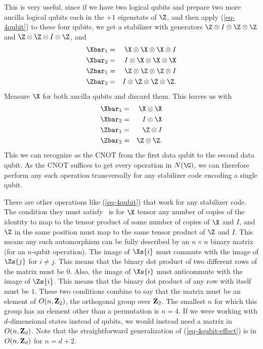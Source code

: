This is very useful, since if we have two logical qubits and prepare two more
ancilla logical qubits each in the $+1$ eigenstate of $\Z$, and then apply
(\ref{eq-4qubit}) to these four qubits, we get a stabilizer with generators
$\Z \otimes I \otimes \Z \otimes \Z$ and $\Z \otimes \Z \otimes I \otimes
\Z$, and
\begin{eqnarray}
	\Xbar_1 & = & \X \otimes \X \otimes \X \otimes I \nonumber \\
	\Xbar_2 & = & I \otimes \X \otimes \X \otimes \X \\
	\Zbar_1 & = & \Z \otimes \Z \otimes \Z \otimes I \nonumber \\
	\Zbar_2 & = & I \otimes \Z \otimes \Z \otimes \Z. \nonumber
\end{eqnarray}
Measure $\X$ for both ancilla qubits and discard them.  This leaves us
with
\begin{eqnarray}
	\Xbar_1 & = & \X \otimes \X \nonumber \\
	\Xbar_2 & = & I \otimes \X \\
	\Zbar_1 & = & \Z \otimes I \nonumber \\
	\Zbar_2 & = & \Z \otimes \Z. \nonumber
\end{eqnarray}
This we can recognize as the CNOT from the first data qubit to the second
data qubit.  As the CNOT suffices to get every operation in $N(\G)$, we can
therefore perform any such operation transversally for any stabilizer code
encoding a single qubit.

There are other operations like (\ref{eq-4qubit}) that work for any
stabilizer code.  The condition they must satisfy~\cite{rains-orthogonal} is
for $\X$ tensor any number of copies of the identity to map to the tensor
product of some number of copies of $\X$ and $I$, and $\Z$ in the same
position must map to the same tensor product of $\Z$ and $I$.  This means
any such automorphism can be fully described by an $n \times n$ binary
matrix (for an $n$-qubit operation).  The image of $\Xs{i}$ must commute
with the image of $\Zs{j}$ for $i \neq j$.  This means that the binary dot
product of two different rows of the matrix must be $0$.  Also, the image
of $\Xs{i}$ must anticommute with the image of $\Zs{i}$.  This means that
the binary dot product of any row with itself must be $1$.  These two
conditions combine to say that the matrix must be an element of $O(n,
	{\bf Z}_2)$, the orthogonal group over ${\bf Z}_2$.  The smallest $n$ for
which this group has an element other than a permutation is $n=4$.  If we
were working with $d$-dimensional states instead of qubits, we would instead
need a matrix in $O(n, {\bf Z}_d)$.  Note that the straightforward
generalization of (\ref{eq-4qubit-effect}) is in $O(n, {\bf Z}_d)$ for
$n=d+2$.

